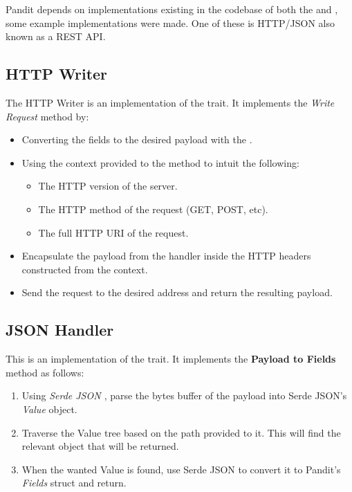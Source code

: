 \documentclass[a4paper,12pt]{report}
\begin{document}
Pandit depends on implementations existing in the codebase of both the  and , some example implementations were made.
One of these is HTTP/JSON also known as a REST API.

\subsection{HTTP Writer}

The HTTP Writer is an implementation of the  trait.
It implements the \textit{Write Request} method by:
\begin{itemize}
    \item Converting the fields to the desired payload with the .
    \item Using the context provided to the method to intuit the following:
    \begin{itemize}
        \item The HTTP version of the server.
        \item The HTTP method of the request (GET, POST, etc).
        \item The full HTTP URI of the request.
    \end{itemize}
    \item Encapsulate the payload from the handler inside the HTTP headers constructed from the context.
    \item Send the request to the desired address and return the resulting payload.
\end{itemize}

\subsection{JSON Handler}
This is an implementation of the  trait.
It implements the \textbf{Payload to Fields} method as follows:
\begin{enumerate}
    \item Using \textit{Serde JSON \cite{serde_json}}, parse the bytes buffer of the payload into Serde JSON's \textit{Value} object.
    \item Traverse the Value tree based on the path provided to it. This will find the relevant object that will be returned.
    \item When the wanted Value is found, use Serde JSON to convert it to Pandit's \textit{Fields} struct and return.
\end{enumerate}
\end{document}
